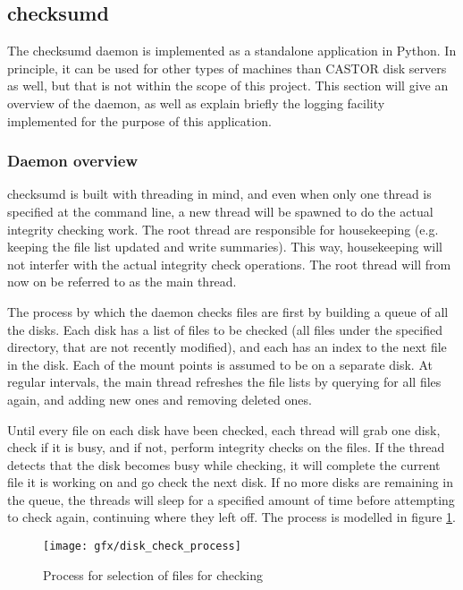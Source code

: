 \subsection{checksumd}
The checksumd daemon is implemented as a standalone application in Python. In principle, it can be used for other types of machines than CASTOR disk servers as well, but that is not within the scope of this project. This section will give an overview of the daemon, as well as explain briefly the logging facility implemented for the purpose of this application.

\subsubsection{Daemon overview}
checksumd is built with threading in mind, and even when only one thread is specified at the command line, a new thread will be spawned to do the actual integrity checking work. The root thread are responsible for housekeeping (e.g. keeping the file list updated and write summaries). This way, housekeeping will not interfer with the actual integrity check operations. The root thread will from now on be referred to as the main thread.

The process by which the daemon checks files are first by building a queue of all the disks. Each disk has a list of files to be checked (all files under the specified directory, that are not recently modified), and each has an index to the next file in the disk. Each of the mount points is assumed to be on a separate disk. At regular intervals, the main thread refreshes the file lists by querying for all files again, and adding new ones and removing deleted ones. 

Until every file on each disk have been checked, each thread will grab one disk, check if it is busy, and if not, perform integrity checks on the files. If the thread detects that the disk becomes busy while checking, it will complete the current file it is working on and go check the next disk. If no more disks are remaining in the queue, the threads will sleep for a specified amount of time before attempting to check again, continuing where they left off. The process is modelled in figure \ref{fig:checksum_process}.

\begin{figure}[ht]
\centering
\texttt{[image: gfx/disk\_check\_process]}
\caption{Process for selection of files for checking}
\label{fig:checksum_process}
\end{figure}

